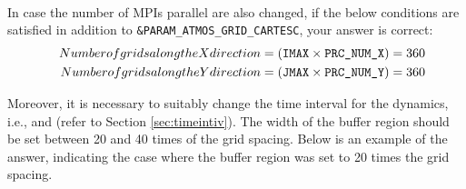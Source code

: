\begin{enumerate}
\\

In case the number of MPIs parallel are also changed, if the below conditions are satisfied in addition to \verb|&PARAM_ATMOS_GRID_CARTESC|, your answer is correct:
\begin{eqnarray}
&& Number of grids along the X direction = \left(\verb|IMAX| \times \verb|PRC_NUM_X|\right) = 360 \\\nonumber
&& Number of grids along the Y direction = \left(\verb|JMAX| \times \verb|PRC_NUM_Y|\right) = 360 \nonumber
\end{eqnarray}

Moreover, it is necessary to suitably change the time interval for the dynamics,\\
 i.e.,  and  (refer to Section \ref{sec:timeintiv}). The width of the buffer region should be set between 20 and 40 times of the grid spacing. Below is an example of the answer, indicating the case where the buffer region was set to 20 times the grid spacing.

\\



\end{enumerate}
